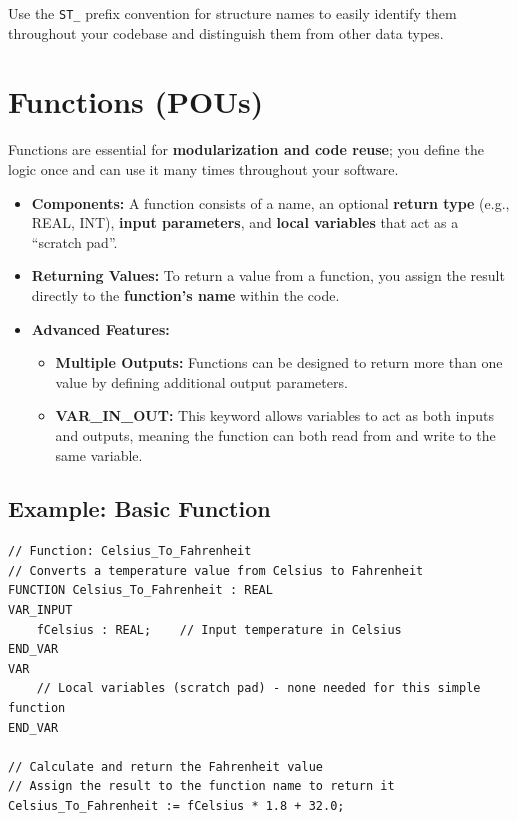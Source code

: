 \documentclass[11pt,a4paper]{article}
\begin{document}
\begin{tipbox}
Use the \texttt{ST\_} prefix convention for structure names to easily identify them throughout your codebase and distinguish them from other data types.
\end{tipbox}

\section{Functions (POUs)}

Functions are essential for \textbf{modularization and code reuse}; you define the logic once and can use it many times throughout your software.

\begin{itemize}[leftmargin=*]
    \item \textbf{Components:} A function consists of a name, an optional \textbf{return type} (e.g., REAL, INT), \textbf{input parameters}, and \textbf{local variables} that act as a ``scratch pad''.
    
    \item \textbf{Returning Values:} To return a value from a function, you assign the result directly to the \textbf{function's name} within the code.
    
    \item \textbf{Advanced Features:}
    \begin{itemize}
        \item \textbf{Multiple Outputs:} Functions can be designed to return more than one value by defining additional output parameters.
        \item \textbf{VAR\_IN\_OUT:} This keyword allows variables to act as both inputs and outputs, meaning the function can both read from and write to the same variable.
    \end{itemize}
\end{itemize}

\subsection*{Example: Basic Function}

\begin{lstlisting}
// Function: Celsius_To_Fahrenheit
// Converts a temperature value from Celsius to Fahrenheit
FUNCTION Celsius_To_Fahrenheit : REAL
VAR_INPUT
    fCelsius : REAL;    // Input temperature in Celsius
END_VAR
VAR
    // Local variables (scratch pad) - none needed for this simple function
END_VAR

// Calculate and return the Fahrenheit value
// Assign the result to the function name to return it
Celsius_To_Fahrenheit := fCelsius * 1.8 + 32.0;
\end{lstlisting}
\end{document}
